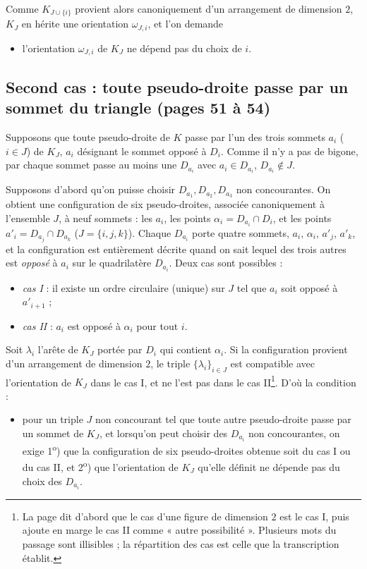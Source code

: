 \documentclass[11pt,a4paper]{article}
\begin{document}
Comme $K_{J \cup \{i\}}$ provient alors canoniquement d'un arrangement de
dimension $2$, $K_J$ en hérite une orientation $\omega_{J,i}$, et l'on demande
\begin{itemize}
  \item[(A5)] l'orientation $\omega_{J,i}$ de $K_J$ ne dépend pas du choix de $i$.
\end{itemize}

\subsection*{Second cas : toute pseudo-droite passe par un sommet du triangle (pages 51 à 54)}

Supposons que toute pseudo-droite de $K$ passe par l'un des trois sommets
$a_i$ ($i \in J$) de $K_J$, $a_i$ désignant le sommet opposé à $D_i$. Comme
il n'y a pas de bigone, par chaque sommet passe au moins une $D_{a_i}$ avec
$a_i \in D_{a_i}$, $D_{a_i} \notin J$.

Supposons d'abord qu'on puisse choisir $D_{a_1}, D_{a_2}, D_{a_3}$ non
concourantes. On obtient une configuration de six pseudo-droites, associée
canoniquement à l'ensemble $J$, à neuf sommets : les $a_i$, les points
$\alpha_i = D_{a_i} \cap D_i$, et les points $a'_i = D_{a_j} \cap D_{a_k}$ ($J
= \{i, j, k\}$). Chaque $D_{a_i}$ porte quatre sommets, $a_i$, $\alpha_i$,
$a'_j$, $a'_k$, et la configuration est entièrement décrite quand on sait
lequel des trois autres est \emph{opposé} à $a_i$ sur le quadrilatère
$D_{a_i}$. Deux cas sont possibles :
\begin{itemize}
  \item \emph{cas I} : il existe un ordre circulaire (unique) sur $J$ tel
  que $a_i$ soit opposé à $a'_{i+1}$ ;
  \item \emph{cas II} : $a_i$ est opposé à $\alpha_i$ pour tout $i$.
\end{itemize}
Soit $\lambda_i$ l'arête de $K_J$ portée par $D_i$ qui contient
$\alpha_i$. Si la configuration provient d'un arrangement de dimension $2$,
le triple $\{\lambda_i\}_{i \in J}$ est compatible avec l'orientation de
$K_J$ dans le cas I, et ne l'est pas dans le cas II\footnote{La page dit
d'abord que le cas d'une figure de dimension $2$ est le cas I, puis ajoute en
marge le cas II comme « autre possibilité ». Plusieurs mots du passage sont
illisibles ; la répartition des cas est celle que la transcription
établit.}. D'où la condition :
\begin{itemize}
  \item[(A6)] pour un triple $J$ non concourant tel que toute autre pseudo-droite
  passe par un sommet de $K_J$, et lorsqu'on peut choisir des $D_{a_i}$ non
  concourantes, on exige 1\textsuperscript{o}) que la configuration de six
  pseudo-droites obtenue soit du cas I ou du cas II, et 2\textsuperscript{o})
  que l'orientation de $K_J$ qu'elle définit ne dépende pas du choix des
  $D_{a_i}$.
\end{itemize}
\end{document}
